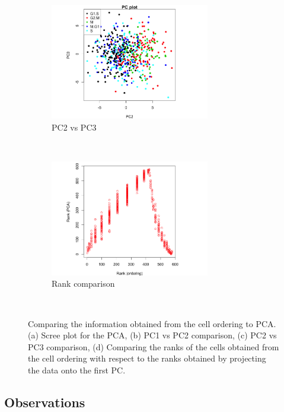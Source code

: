 \documentclass[11pt]{article}
\begin{document}
\begin{figure}[ht]
     \begin{subfigure}[t]{0.5\textwidth}
        \centering
        \includegraphics[height=2in]{../figures/cell_order_R_figs/PC_plot_23.png}
        \caption{PC2 vs PC3}
    \end{subfigure}%
    ~
    \begin{subfigure}[t]{0.5\textwidth}
        \centering
        \includegraphics[height=2in]{../figures/cell_order_R_figs/pca_cellorder_rank_compare.png}
        \caption{Rank comparison}
    \end{subfigure}\\
  \caption{Comparing the information obtained from the cell ordering to PCA. (a) Scree plot  for the PCA, (b) PC1 vs PC2 comparison,
  (c) PC2 vs PC3 comparison, (d) Comparing the ranks of the cells obtained from the cell ordering with respect to the ranks obtained by projecting the data onto the first PC.}
 \label{fig:fig6}
 \end{figure}   

\subsection{Observations}
\end{document}
